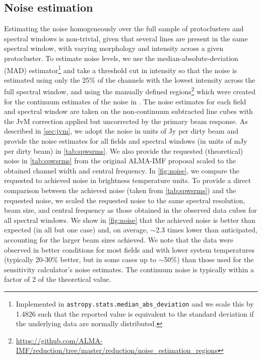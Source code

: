 \documentclass[longauth]{aa} %
\begin{document}
\subsection{Noise estimation}
\label{sec:noise}
Estimating the noise homogeneously over the full sample of protoclusters and spectral windows is non-trivial, given that several lines are present in the same spectral window, with varying morphology and intensity across a given protocluster. To estimate noise levels, we use the median-absolute-deviation (MAD) estimator\footnote{Implemented in \texttt{astropy.stats.median\_abs\_deviation} and we scale this by 1.4826 such that the reported value is equivalent to the standard deviation if the underlying data are normally distributed.\label{note:mad}} and take a threshold cut in intensity so that the noise is estimated using only the 25\% of the channels with the lowest intensity across the full spectral window, and using the manually defined regions\footnote{\url{https://github.com/ALMA-IMF/reduction/tree/master/reduction/noise\_estimation\_regions}} which were created for the continuum estimates of the noise in \citet{Ginsburg2022}. 
The noise estimates for each field and spectral window are taken on the non-continuum subtracted line cubes with the JvM correction applied but uncorrected by the primary beam response.
As described in \cref{sec:jvm}, we adopt the noise in units of Jy per dirty beam and provide the noise estimates for all fields and spectral windows (in units of mJy per dirty beam) in \cref{tab:spwsrms}. We also provide the requested (theoretical) noise in \cref{tab:spwsrms} from the original ALMA-IMF proposal scaled to the obtained channel width and central frequency. In \cref{fig:noise}, we compare the requested to achieved noise in brightness temperature units. To provide a direct comparison between the achieved noise (taken from \ref{tab:spwsrms}) and the requested noise, we scaled the requested noise to the same spectral resolution, beam size, and central frequency as those obtained in the observed data cubes for all spectral windows.  
We show in \cref{fig:noise} that the achieved noise is better than expected (in all but one case) and, on average, $\sim$2.3 times lower than anticipated, accounting for the larger beam sizes achieved. We note that the data were observed in better conditions for most fields and with lower system temperatures (typically 20-30\% better, but in some cases up to $\sim$50\%) than those used for the sensitivity calculator's noise estimates. The continuum noise is typically within a factor of 2 \citep{Ginsburg2022} of the theoretical value. 
\end{document}
